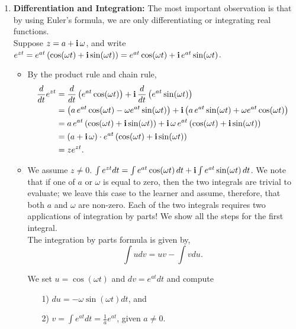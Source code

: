 \begin{enumerate}
    \item \textbf{Differentiation and Integration:} The most important observation is that by using Euler's formula, we are only differentiating or integrating real functions.\\
    
    Suppose $z = a + \mathop{\bm{\mathrm i}} \omega$, and write $e^{zt} = e^{at}\left( \cos(\omega t) + \mathop{\bm{\mathrm i}} \sin(\omega t) \right) = e^{at} \cos(\omega t) + \mathop{\bm{\mathrm i}} e^{at} \sin(\omega t) $. 
    \begin{itemize}
        \item By the product rule and chain rule,
        \begin{align*}
            \frac{d}{dt}e^{zt} &= \frac{d}{dt} \left(  e^{at} \cos(\omega t) \right) + \mathop{\bm{\mathrm i}}  \frac{d}{dt} \left(  e^{at} \sin(\omega t) \right) \\
            & =  \left(  a \, e^{at} \cos(\omega t) - \omega  e^{at} \sin(\omega t) \right) + \mathop{\bm{\mathrm i}}  \left(  a \,  e^{at} \sin(\omega t) + \omega e^{at} \cos(\omega t) \right) \\
            &= a \, e^{at}\left( \cos(\omega t) + \mathop{\bm{\mathrm i}} \sin(\omega t) \right) + \mathop{\bm{\mathrm i}} \omega \, e^{at}\left( \cos(\omega t) + \mathop{\bm{\mathrm i}} \sin(\omega t) \right) \\
            &= (a + \mathop{\bm{\mathrm i}} \omega) \cdot e^{at}\left( \cos(\omega t) + \mathop{\bm{\mathrm i}} \sin(\omega t) \right) \\
            & = z e^{z t}.
        \end{align*} 

        \item We assume $z \neq 0$.  $\int e^{zt} dt = \int e^{at} \cos(\omega t) \, dt + \mathop{\bm{\mathrm i}} \int e^{at} \sin(\omega t) \, dt$. We note that if one of $a$ or $\omega$ is equal to zero, then the two integrals are trivial to evaluate; we leave this case to the learner and assume, therefore, that both $a$ and $\omega$ are non-zero. Each of the two integrals requires two applications of integration by parts! We show all the steps for the first integral. \\

The integration by parts formula is given by,
\[
\int u dv = uv - \int v du.
\]

We set \(u = \cos(\omega t)\) and \(dv = e^{at} dt\) and compute
\begin{itemize}
    \item[1)]  \(du = -\omega \sin(\omega t) dt\), and
    \item[2)]  \(v = \int e^{at} dt = \frac{1}{a} e^{at}\), given \(a \neq 0\).
\end{itemize}



\end{itemize}
\end{enumerate}
